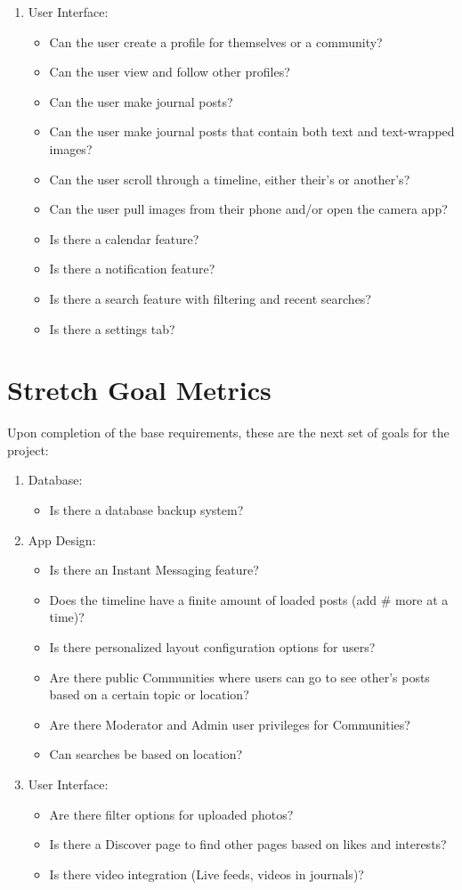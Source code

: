 \documentclass[letterpaper, 10, draftclsnofoot, onecolumn]{IEEEtran}
\begin{document}
\begin{enumerate}
\item User Interface:
\begin{itemize}
\item Can the user create a profile for themselves or a community?
\item Can the user view and follow other profiles?
\item Can the user make journal posts?
\item Can the user make journal posts that contain both text and text-wrapped images?
\item Can the user scroll through a timeline, either their's or another's?
\item Can the user pull images from their phone and/or open the camera app?
\item Is there a calendar feature?
\item Is there a notification feature?
\item Is there a search feature with filtering and recent searches?
\item Is there a settings tab?
\end{itemize} 
\end{enumerate}
%
\clearpage
\section*{Stretch Goal Metrics}\par
\hspace{4ex}Upon completion of the base requirements, these are the next set of goals for the project:
\begin{enumerate}
\item Database:
\begin{itemize}
\item Is there a database backup system?
\end{itemize}
\item App Design:
\begin{itemize}
\item Is there an Instant Messaging feature?
\item Does the timeline have a finite amount of loaded posts (add \# more at a time)?
\item Is there personalized layout configuration options for users?
\item Are there public Communities where users can go to see other's posts based on a certain topic or location?
\item Are there Moderator and Admin user privileges for Communities?
\item Can searches be based on location?
\end{itemize}
\item User Interface:
\begin{itemize}
\item Are there filter options for uploaded photos?
\item Is there a Discover page to find other pages based on likes and interests?
\item Is there video integration (Live feeds, videos in journals)?
\end{itemize} 
\end{enumerate}
\end{document}
